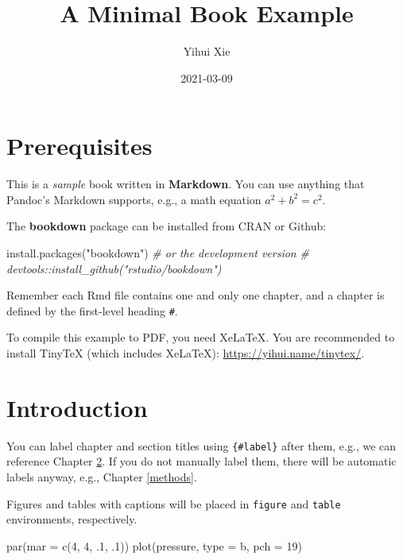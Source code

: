 \documentclass[
]{book}
\title{A Minimal Book Example}
\author{Yihui Xie}
\date{2021-03-09}
\newenvironment{Shaded}{\begin{snugshade}}{\end{snugshade}}
\newcommand{\AttributeTok}[1]{\textcolor[rgb]{0.77,0.63,0.00}{#1}}
\newcommand{\CommentTok}[1]{\textcolor[rgb]{0.56,0.35,0.01}{\textit{#1}}}
\newcommand{\DecValTok}[1]{\textcolor[rgb]{0.00,0.00,0.81}{#1}}
\newcommand{\FunctionTok}[1]{\textcolor[rgb]{0.00,0.00,0.00}{#1}}
\newcommand{\NormalTok}[1]{#1}
\newcommand{\StringTok}[1]{\textcolor[rgb]{0.31,0.60,0.02}{#1}}
\begin{document}
\maketitle

{
\setcounter{tocdepth}{1}
\tableofcontents
}
\hypertarget{prerequisites}{%
\chapter{Prerequisites}\label{prerequisites}}

This is a \emph{sample} book written in \textbf{Markdown}. You can use anything that Pandoc's Markdown supports, e.g., a math equation \(a^2 + b^2 = c^2\).

The \textbf{bookdown} package can be installed from CRAN or Github:

\begin{Shaded}
\begin{Highlighting}[]
\FunctionTok{install.packages}\NormalTok{(}\StringTok{"bookdown"}\NormalTok{)}
\CommentTok{\# or the development version}
\CommentTok{\# devtools::install\_github("rstudio/bookdown")}
\end{Highlighting}
\end{Shaded}

Remember each Rmd file contains one and only one chapter, and a chapter is defined by the first-level heading \texttt{\#}.

To compile this example to PDF, you need XeLaTeX. You are recommended to install TinyTeX (which includes XeLaTeX): \url{https://yihui.name/tinytex/}.

\hypertarget{intro}{%
\chapter{Introduction}\label{intro}}

You can label chapter and section titles using \texttt{\{\#label\}} after them, e.g., we can reference Chapter \ref{intro}. If you do not manually label them, there will be automatic labels anyway, e.g., Chapter \ref{methods}.

Figures and tables with captions will be placed in \texttt{figure} and \texttt{table} environments, respectively.

\begin{Shaded}
\begin{Highlighting}[]
\FunctionTok{par}\NormalTok{(}\AttributeTok{mar =} \FunctionTok{c}\NormalTok{(}\DecValTok{4}\NormalTok{, }\DecValTok{4}\NormalTok{, .}\DecValTok{1}\NormalTok{, .}\DecValTok{1}\NormalTok{))}
\FunctionTok{plot}\NormalTok{(pressure, }\AttributeTok{type =} \StringTok{\textquotesingle{}b\textquotesingle{}}\NormalTok{, }\AttributeTok{pch =} \DecValTok{19}\NormalTok{)}
\end{Highlighting}
\end{Shaded}
\end{document}
